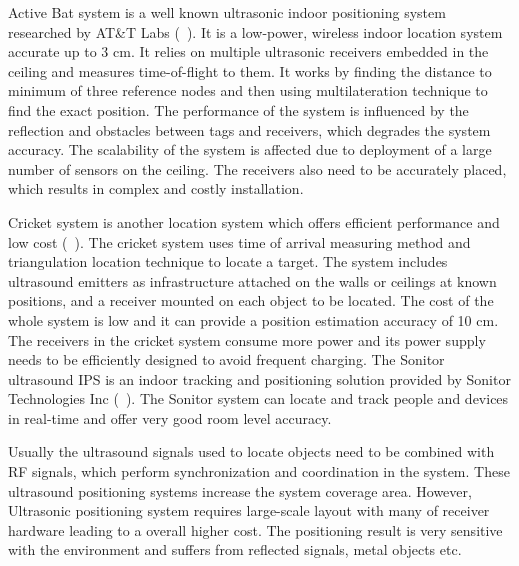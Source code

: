 Active Bat system is a well known 
ultrasonic indoor positioning system researched by AT\&T Labs (~\citet{ultrasound04}).
It is a low-power, wireless indoor location system accurate up to 3 cm. 
It relies on multiple ultrasonic receivers embedded in the ceiling 
and measures time-of-flight to them. It works by finding 
the distance to minimum of three reference 
nodes and then using multilateration technique to find the exact position. 
The performance of the system is influenced
by the reflection and obstacles between tags and receivers,
which degrades the system accuracy. The scalability of the system 
is affected due to deployment of 
a large number of sensors on the ceiling. 
The receivers also need to be accurately placed,
which results in complex and costly installation.

Cricket system is another location system which offers 
efficient performance and low cost (~\cite{priyantha00,priyantha05}). 
The cricket system uses time of arrival measuring method
and triangulation location technique to locate a target. The
system includes ultrasound emitters as infrastructure
attached on the walls or ceilings at known positions, and a
receiver mounted on each object to be located.
The cost of the whole system is low and it can 
provide a position estimation accuracy of 10 cm.
The receivers in the cricket system consume more power 
and its power supply needs to be efficiently designed 
to avoid frequent charging.
The Sonitor ultrasound IPS is an indoor tracking
and positioning solution provided by Sonitor Technologies
Inc (~\citet{sonitor08}). The Sonitor system can locate and track people and
devices in real-time and offer very good room level accuracy. 

 Usually the ultrasound signals used to locate
objects need to be combined with RF signals, which perform
synchronization and coordination in the system. These ultrasound
positioning systems increase the system coverage area.
However, Ultrasonic positioning system requires 
large-scale layout with many of receiver hardware 
leading to a overall higher cost. 
The positioning result is very sensitive with the
environment and suffers from reflected signals, 
metal objects etc. 

